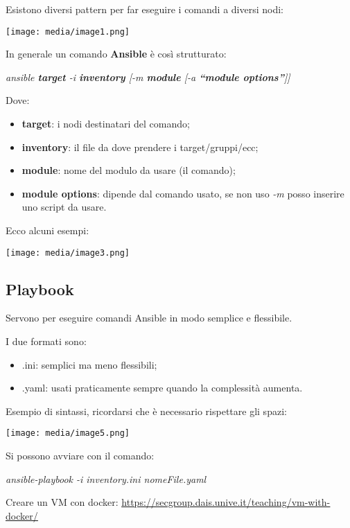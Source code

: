 Esistono diversi pattern per far eseguire i comandi a diversi nodi:

\texttt{[image: media/image1.png]}

In generale un comando \textbf{Ansible} è così strutturato:

\emph{ansible \textbf{target} -i \textbf{inventory} {[}-m
\textbf{module} {[}-a \textbf{``module options''}{]}{]}}

Dove:

\begin{itemize}
\item
  \textbf{target}: i nodi destinatari del comando;
\item
  \textbf{inventory}: il file da dove prendere i target/gruppi/ecc;
\item
  \textbf{module}: nome del modulo da usare (il comando);
\item
  \textbf{module options}: dipende dal comando usato, se non uso
  \emph{-m} posso inserire uno script da usare.
\end{itemize}

Ecco alcuni esempi:

\texttt{[image: media/image3.png]}

\subsection{Playbook}\label{playbook}

Servono per eseguire comandi Ansible in modo semplice e flessibile.

I due formati sono:

\begin{itemize}
\item
  .ini: semplici ma meno flessibili;
\item
  .yaml: usati praticamente sempre quando la complessità aumenta.
\end{itemize}

Esempio di sintassi, ricordarsi che è necessario rispettare gli spazi:

\texttt{[image: media/image5.png]}

Si possono avviare con il comando:

\emph{ansible-playbook -i inventory.ini nomeFile.yaml}

Creare un VM con docker:
\href{https://secgroup.dais.unive.it/teaching/vm-with-docker/}{\ul{https://secgroup.dais.unive.it/teaching/vm-with-docker/}}

